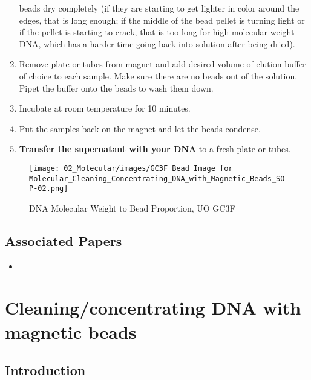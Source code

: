 \documentclass[
  letterpaper,
  DIV=11,
  numbers=noendperiod]{scrreprt}
\providecommand{\tightlist}{%
  \setlength{\itemsep}{0pt}\setlength{\parskip}{0pt}}\usepackage{longtable,booktabs,array}
\begin{document}
\begin{enumerate}
  beads dry completely (if they are starting to get lighter in color
  around the edges, that is long enough; if the middle of the bead
  pellet is turning light or if the pellet is starting to crack, that is
  too long for high molecular weight DNA, which has a harder time going
  back into solution after being dried).
\item
  Remove plate or tubes from magnet and add desired volume of elution
  buffer of choice to each sample. Make sure there are no beads out of
  the solution. Pipet the buffer onto the beads to wash them down.
\item
  Incubate at room temperature for 10 minutes.
\item
  Put the samples back on the magnet and let the beads condense.
\item
  \textbf{Transfer the supernatant with your DNA} to a fresh plate or
  tubes.
\end{enumerate}

\begin{figure}

{\centering \texttt{[image: 02\_Molecular/images/GC3F Bead Image for Molecular\_Cleaning\_Concentrating\_DNA\_with\_Magnetic\_Beads\_SOP-02.png]}

}

\caption{DNA Molecular Weight to Bead Proportion, UO GC3F}

\end{figure}

\hypertarget{associated-papers-12}{%
\section{Associated Papers}\label{associated-papers-12}}

\begin{itemize}
\tightlist
\item
\end{itemize}

\hypertarget{sec-molecular-bead_extraction}{%
\chapter{Cleaning/concentrating DNA with magnetic
beads}\label{sec-molecular-bead_extraction}}

\hypertarget{introduction-20}{%
\section{Introduction}\label{introduction-20}}
\end{document}
